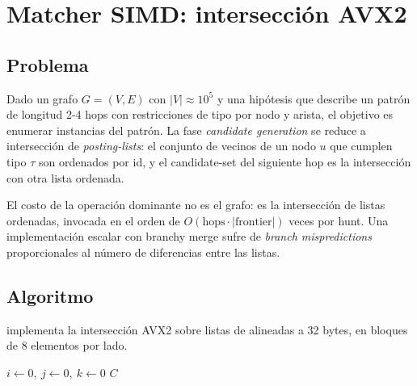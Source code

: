 \chapter{Matcher SIMD: intersección AVX2}
\label{sec:paper-simd}

\section{Problema}

Dado un grafo $G = (V, E)$ con $|V| \approx 10^5$ y una hipótesis
que describe un patrón de longitud 2-4 hops con restricciones de
tipo por nodo y arista, el objetivo es enumerar instancias del
patrón. La fase \emph{candidate generation} se reduce a
intersección de \emph{posting-lists}: el conjunto de vecinos de
un nodo $u$ que cumplen tipo $\tau$ son ordenados por 
id, y el candidate-set del siguiente hop es la intersección con
otra lista ordenada.

El costo de la operación dominante no es el grafo: es la
intersección de listas ordenadas, invocada en el orden de
$O(\text{hops} \cdot |\text{frontier}|)$ veces por hunt. Una
implementación escalar con branchy merge sufre de \emph{branch
mispredictions} proporcionales al número de diferencias entre las
listas.

\section{Algoritmo}

 implementa la intersección AVX2 sobre
listas de  alineadas a 32 bytes, en bloques de 8 elementos
por lado.

\begin{algorithm}[H]
\caption{Intersección SIMD de posting-lists u32 ordenadas}
\label{alg:paper-simd}
$i \gets 0,\ j \gets 0,\ k \gets 0$\;
\Return $C$
\end{algorithm}

